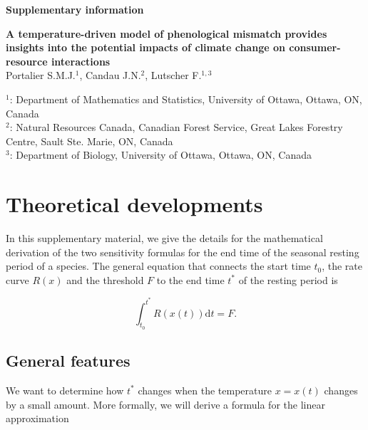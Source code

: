 \documentclass[12 pt]{article}
\begin{document}
\begin{Large}
\begin{center}
\textbf{Supplementary information}
\end{center}
\end{Large}
\begin{large}
\textbf{A temperature-driven model of phenological mismatch provides insights into the potential impacts of climate change on consumer-resource interactions} \\
\vspace{1 cm}
Portalier S.M.J.$^{1}$, Candau J.N.$^2$, Lutscher F.$^{1,3}$ \\
\end{large}
$^1$: Department of Mathematics and Statistics, University of Ottawa, Ottawa, ON, Canada \\
$^2$: Natural Resources Canada, Canadian Forest Service, Great Lakes Forestry Centre, Sault Ste. Marie, ON, Canada\\
$^3$: Department of Biology, University of Ottawa, Ottawa, ON, Canada \\
 
\vspace{0.5 cm}
\section{Theoretical developments}
In this supplementary material, we give the details for the mathematical derivation of the two sensitivity formulas for the end time of the seasonal resting period of a species. The general equation that connects the start time $t_0$, the rate curve $R(x)$ and the threshold $F$ to the end time $t^*$ of the resting period is

\begin{equation}
    \int _{t_0} ^{t^*} R(x(t)) \mathrm{d}t = F. \tag*{Eq. S\theequation}
\end{equation}

\subsection*{General features}
We want to determine how $t^*$ changes when the temperature $x = x(t)$ changes by a small amount. More formally, we will derive a formula for the linear approximation
\end{document}
